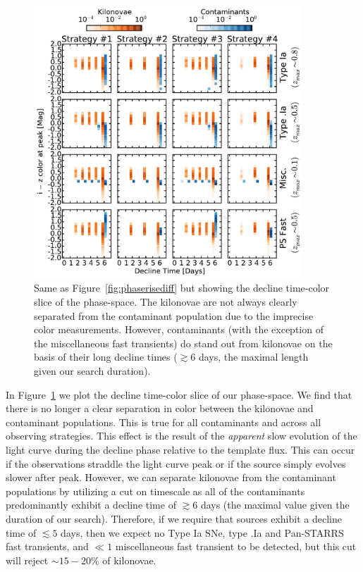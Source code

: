\begin{figure}[t!]
\centering
\includegraphics[width=0.9\textwidth]{./figs/chapter2/ch2_f16.pdf}
\caption{Same as Figure~\ref{fig:phaserisediff} but showing the decline time-color slice of the phase-space. The kilonovae are not always clearly separated from the contaminant population due to the imprecise color measurements. However, contaminants (with the exception of the miscellaneous fast transients) do stand out from kilonovae on the basis of their long decline times ($\gtrsim 6$ days, the maximal length given our search duration).}
\label{fig:phasedecdiff}
\end{figure}
   
In Figure~\ref{fig:phasedecdiff} we plot the decline time-color slice of our phase-space. We find that there is no longer a clear separation in color between the kilonovae and contaminant populations. This is true for all contaminants and across all observing strategies. This effect is the result of the {\em apparent} slow evolution of the light curve during the decline phase relative to the template flux. This can occur if the observations straddle the light curve peak or if the source simply evolves slower after peak. However, we can separate kilonovae from the contaminant populations by utilizing a cut on timescale as all of the contaminants predominantly exhibit a decline time of $\gtrsim 6$ days (the maximal value given the duration of our search). Therefore, if we require that sources exhibit a decline time of $\lesssim 5$ days, then we expect no Type Ia SNe, type .Ia and Pan-STARRS fast transients, and $\ll 1$ miscellaneous fast transient to be detected, but this cut will reject $\sim15-20\%$ of kilonovae.

